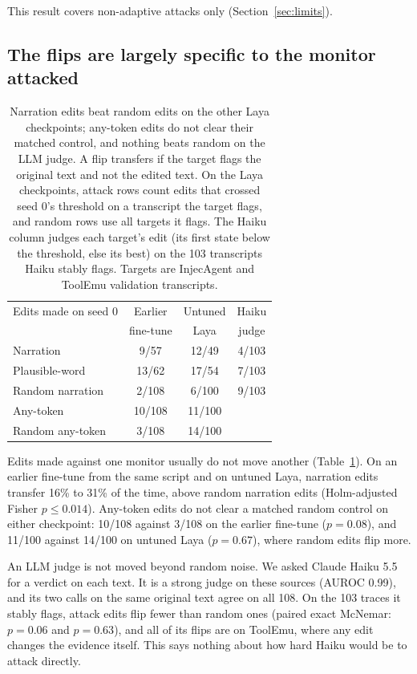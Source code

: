 \documentclass[letterpaper]{article} %
\begin{document}
This result covers non-adaptive attacks only (Section~\ref{sec:limits}).

\subsection{The flips are largely specific to the monitor attacked}
\label{sec:transfer}

\begin{table}[t]
\small\centering
\setlength{\tabcolsep}{3pt}
\begin{tabular}{@{}lccc@{}}
\toprule
Edits made on seed 0 & Earlier & Untuned & Haiku \\
 & fine-tune & Laya & judge \\
\midrule
Narration & 9/57 & 12/49 & 4/103 \\
Plausible-word & 13/62 & 17/54 & 7/103 \\
Random narration & 2/108 & 6/100 & 9/103 \\
\midrule
Any-token & 10/108 & 11/100 & \\
Random any-token & 3/108 & 14/100 & \\
\bottomrule
\end{tabular}
\caption{Narration edits beat random edits on the other Laya checkpoints; any-token edits do not clear their matched control, and nothing beats random on the LLM judge. A flip transfers if the target flags the original text and not the edited text. On the Laya checkpoints, attack rows count edits that crossed seed 0's threshold on a transcript the target flags, and random rows use all targets it flags. The Haiku column judges each target's edit (its first state below the threshold, else its best) on the 103 transcripts Haiku stably flags. Targets are InjecAgent and ToolEmu validation transcripts.}
\label{tab:transfer}
\end{table}

Edits made against one monitor usually do not move another (Table~\ref{tab:transfer}). On an earlier fine-tune from the same script and on untuned Laya, narration edits transfer 16\% to 31\% of the time, above random narration edits (Holm-adjusted Fisher $p \le 0.014$). Any-token edits do not clear a matched random control on either checkpoint: 10/108 against 3/108 on the earlier fine-tune ($p = 0.08$), and 11/100 against 14/100 on untuned Laya ($p = 0.67$), where random edits flip more.

An LLM judge is not moved beyond random noise. We asked Claude Haiku 5.5 for a verdict on each text. It is a strong judge on these sources (AUROC 0.99), and its two calls on the same original text agree on all 108. On the 103 traces it stably flags, attack edits flip fewer than random ones (paired exact McNemar: $p = 0.06$ and $p = 0.63$), and all of its flips are on ToolEmu, where any edit changes the evidence itself. This says nothing about how hard Haiku would be to attack directly.
\end{document}
